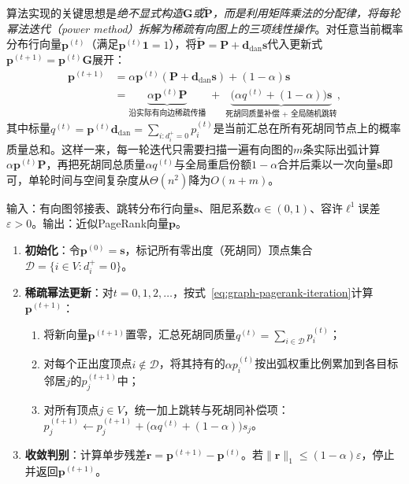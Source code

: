 算法实现的关键思想是\emph{绝不显式构造$\bm G$或$\widetilde{\bm P}$，而是利用矩阵乘法的分配律，将每轮幂法迭代（power method）拆解为稀疏有向图上的三项线性操作}。对任意当前概率分布行向量$\bm p^{(t)}$（满足$\bm p^{(t)}\bm 1=1$），将$\widetilde{\bm P}=\bm P+\bm d_{\mathrm{dan}}\bm s$代入更新式$\bm p^{(t+1)}=\bm p^{(t)}\bm G$展开：
\begin{equation}
\begin{aligned}
\bm{p}^{(t+1)}
&= \alpha\bm{p}^{(t)}(\bm P + \bm d_{\mathrm{dan}}\bm s) + (1-\alpha)\bm{s} \\
&= \underbrace{\alpha\bm{p}^{(t)}\bm{P}}_{\text{沿实际有向边稀疏传播}}
   \;+\; \underbrace{\bigl(\alpha q^{(t)} + (1-\alpha)\bigr)\bm{s}}_{\text{死胡同质量补偿 + 全局随机跳转}},
\end{aligned}
\label{eq:graph-pagerank-iteration}
\end{equation}
其中标量$q^{(t)}=\bm p^{(t)}\bm d_{\mathrm{dan}}=\sum_{i:d_i^+=0}p_i^{(t)}$是当前汇总在所有死胡同节点上的概率质量总和。这样一来，每一轮迭代只需要扫描一遍有向图的$m$条实际出弧计算$\alpha\bm p^{(t)}\bm P$，再把死胡同总质量$\alpha q^{(t)}$与全局重启份额$1-\alpha$合并后乘以一次向量$\bm s$即可，单轮时间与空间复杂度从$\Theta(n^2)$降为$O(n+m)$。

\begin{algorithm}[PageRank幂法迭代]
\label{alg:graph-pagerank-iteration}
输入：有向图邻接表、跳转分布行向量$\bm{s}$、阻尼系数$\alpha\in(0,1)$、容许$\ell^1$误差$\varepsilon>0$。输出：近似PageRank向量$\bm{p}$。
\begin{enumerate}
  \item \textbf{初始化}：令$\bm{p}^{(0)}=\bm{s}$，标记所有零出度（死胡同）顶点集合$\mathcal D=\{i\in V:d_i^+=0\}$。
  \item \textbf{稀疏幂法更新}：对$t=0,1,2,\ldots$，按式~\eqref{eq:graph-pagerank-iteration}计算$\bm p^{(t+1)}$：
    \begin{enumerate}
      \item 将新向量$\bm p^{(t+1)}$置零，汇总死胡同质量$q^{(t)}=\sum_{i\in\mathcal D}p_i^{(t)}$；
      \item 对每个正出度顶点$i\notin\mathcal D$，将其持有的$\alpha p_i^{(t)}$按出弧权重比例累加到各目标邻居$j$的$p_j^{(t+1)}$中；
      \item 对所有顶点$j\in V$，统一加上跳转与死胡同补偿项：$p_j^{(t+1)}\leftarrow p_j^{(t+1)}+\bigl(\alpha q^{(t)}+(1-\alpha)\bigr)s_j$。
    \end{enumerate}
  \item \textbf{收敛判别}：计算单步残差$\bm{r}=\bm{p}^{(t+1)}-\bm{p}^{(t)}$。若$\lVert\bm{r}\rVert_1\le(1-\alpha)\varepsilon$，停止并返回$\bm{p}^{(t+1)}$。
\end{enumerate}
\end{algorithm}

